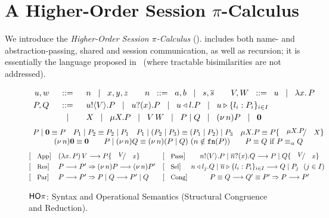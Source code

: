 \documentclass[a4paper,UKenglish]{lipics}
\theoremstyle{definition}
\begin{document}
\section{A Higher-Order Session $\pi$-Calculus}
\label{sec:calculus}

\noindent 
We introduce the %
\emph{Higher-Order Session $\pi$-Calculus} (\HOp).
\HOp includes both name- and abstraction-passing, shared and session communication,  
as well as recursion; it is 
essentially 
the  language
proposed 
in~\cite{tlca07} (where tractable bisimilarities are not addressed). 

\smallskip

 


	\begin{figure}
	\[
		\begin{array}{rcl}
			u,w &\;\;::=\;\;& n \;\;\;|\;\;\; x,y,z \qquad
			n \;\;::=\;\; a,b  \;\;\;|\;\;\; s, \overline{s} \qquad 
			V,W  \;\;::=\;\; u \;\;\;|\;\;\; \lambda x.\,P \\[1mm]
			P,Q & \;\;::=\;\; & u ! \langle V \rangle .{P}  \;\;\;|\;\;\;  u ? (x) .{P} \;\;\;|\;\;\;
			u \triangleleft l . P \;\;\;|\;\;\; u \triangleright \{l_i:P_i\}_{i \in I}   \\[1mm]
			& \;\;\;|\;\;\; & X \;\;\;|\;\;\; \mu X. P \;\;\;|\;\;\; V\, {W} \;\;\;|\;\;\; P\;|\; Q \;\;\;|\;\;\; (\nu\, n) P \;\;\;|\;\;\; \mathbf{0}
		\end{array}
	\]
	\[
	\begin{array}{c}
		P \Par \inact \scong P
		\quad
		P_1 \Par P_2 \scong P_2 \Par P_1
		\quad
		P_1 \Par (P_2 \Par P_3) \scong (P_1 \Par P_2) \Par P_3
		\quad 
		\recp{X}{P} \scong P\subst{\recp{X}{P}}{\rvar{X}}
		\\%

		\news{n} \inact \scong \inact
		\qquad 
		P \Par \news{n} Q \scong \news{n}(P \Par Q)
		\	(n \notin \fn{P})
		\qquad
		P \scong Q \textrm{ if } P \scong_\alpha Q
	\end{array}
\]
	\[
		\!\!\!\begin{array}{lllcrll}
			\orule{App} & (\abs{x}{P}) \, V   \red    P \subst{V}{x}
			& 
			  

			\orule{Pass} & \bout{n}{V} P \Par \binp{\dual{n}}{x} Q   \red   P \Par Q \subst{V}{x} 
			
			\\[1mm]

			 \orule{Res} & P \red P'  \Rightarrow  \news{n} P  \red  \news{n} P' 

			&  
			\orule{Sel}
			&  \!\!\! \bsel{n}{l_j} Q \Par \bbra{\dual{n}}{l_i : P_i}_{i \in I}  \red   Q \Par P_j ~~(j \in I)
			
			\\[1mm]
			\orule{Par} & P \red P'   \Rightarrow    P \Par Q  \red   P' \Par Q  
			&  
			\orule{Cong} & P \scong Q \red Q' \scong P'   \Rightarrow  P  \red  P' 
	\end{array}
	\]
	\vspace{-3mm}
\caption{$\mathsf{HO}\pi$: Syntax and Operational Semantics (Structural Congruence and Reduction).
\label{fig:redsem}}
	\vspace{-2mm}
\end{figure}
\end{document}
